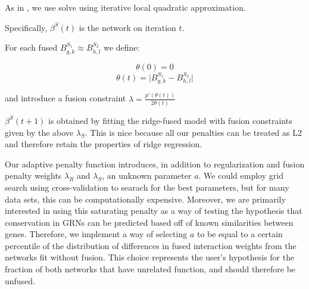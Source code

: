 \documentclass[11pt]{article}
\begin{document}



    
As in \cite{fan2001variable}, we use solve using iterative local quadratic approximation. 

Specifically, $\beta^S(t)$ is the network on iteration $t$. 

For each fused $B^{S_1}_{g,k} \approx B^{S_2}_{h,l}$ we define:

\begin{equation} 
\theta(0)=0
\end{equation}
\begin{equation}
\theta(t) = \vert B^{S_1}_{g,k} - B^{S_2}_{h,l} \vert
\end{equation}

and introduce a fusion constraint $\lambda = \frac{p'(\theta(t))}{2\theta(t)} $

$\beta^S(t+1)$ is obtained by fitting the ridge-fused model with fusion constraints given by the above $\lambda_S$. This is nice because all our penalties can be treated as L2 and therefore retain the properties of ridge regression. 

Our adaptive penalty function introduces, in addition to regularization and fusion penalty weights $\lambda_R$ and $\lambda_S$, an unknown parameter $a$. We could employ grid search using cross-validation to searach for the best parameters, but for many data sets, this can be computationally expensive. Moreover, we are primarily interested in using this saturating penalty as a way of testing the hypothesis that conservation in GRNs can be predicted based off of known similarities between genes. Therefore, we implement a way of selecting $a$ to be equal to a certain percentile of the distribution of differences in fused interaction weights from the networks fit without fusion. This choice represents the user's hypothesis for the fraction of both networks that have unrelated function, and should therefore be unfused. 
\end{document}
